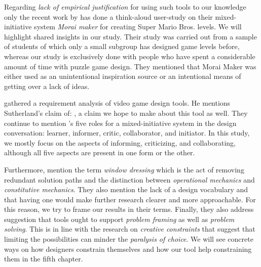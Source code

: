Regarding \textit{lack of empirical justification} for using such tools to our knowledge only the recent work by \cite{Guzdial} has done a think-aloud user-study on their mixed-initiative system \textit{Morai maker} for creating Super Mario Bros. levels. We will highlight shared insights in our study. %
 Their study was carried out from a sample of students of which only a small subgroup has designed game levels before, whereas our study is exclusively done with people who have spent a considerable amount of time with puzzle game design. They mentioned that Morai Maker was either used as an unintentional inspiration source or an intentional means of getting over a lack of ideas.

\cite{Nelson2009} gathered a requirement analysis of video game design tools. He mentions Sutherland's claim of: , a claim we hope to make about this tool as well. They continue to mention \cite{Lawson1997}'s five roles for a mixed-initiative system in the design conversation: learner, informer, critic, collaborator, and initiator. In this study, we mostly focus on the aspects of informing, criticizing, and collaborating, although all five aspects are present in one form or the other.

Furthermore, \cite{Nelson2009} mention the term \textit{window dressing} which is the act of removing redundant solution paths and the distinction between  \textit{operational mechanics} and \textit{constitutive mechanics}. They also mention the lack of a design vocabulary and that having one would make further research clearer and more approachable. For this reason, we try to frame our results in their terms. Finally, they also address \cite{Giaccardi2008} suggestion that tools ought to support \textit{problem framing} as well as \textit{problem solving}. This is in line with the research on \textit{creative constraints} that suggest that limiting the possibilities can minder the \textit{paralysis of choice}. We will see concrete ways on how designers constrain themselves and how our tool help constraining them in the fifth chapter.
